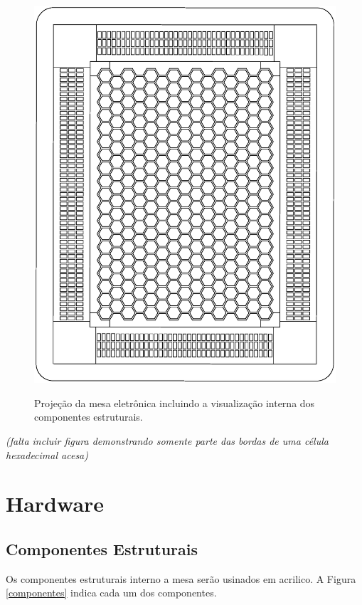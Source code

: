\documentclass[a4paper,10pt]{article}
\begin{document}
\begin{center}
\begin{figure}[h!]
	\center
	\includegraphics[angle=0, scale=0.40]{./img/projeto-v02.ps}
	\label{figura_projeto}
	\caption{Projeção da mesa eletrônica incluindo a visualização interna dos componentes estruturais.}
\end{figure}
\end{center}

{\it (falta incluir figura demonstrando somente parte das bordas de uma célula hexadecimal acesa)}

\section{Hardware}

\subsection{Componentes Estruturais}

Os componentes estruturais interno a mesa serão usinados em acrilico. A Figura \ref{componentes} indica cada um dos componentes.
\end{document}
